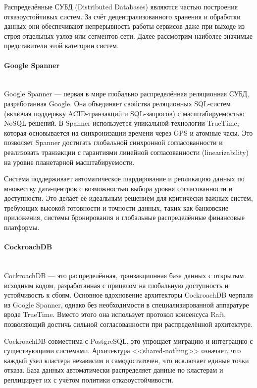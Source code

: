 Распределённые СУБД (Distributed Databases) являются частью построения отказоустойчивых систем. За счёт децентрализованного хранения и обработки данных они обеспечивают непрерывность работы сервисов даже при выходе из строя отдельных узлов или сегментов сети. Далее рассмотрим наиболее значимые представители этой категории систем. \autocite{OszuValduriez}

\paragraph{Google Spanner} ~\\

Google Spanner — первая в мире глобально распределённая реляционная СУБД, разработанная Google. Она объединяет свойства реляционных SQL-систем (включая поддержку ACID-транзакций и SQL-запросов) с масштабируемостью NoSQL-решений. В Spanner используется уникальной технологии TrueTime, которая основывается на синхронизации времени через GPS и атомные часы. Это позволяет Spanner достигать глобальной синхронной согласованности и реализовать транзакции с гарантиями линейной согласованности (linearizability) на уровне планетарной масштабируемости. \autocite{Kleppmann}

Система поддерживает автоматическое шардирование и репликацию данных по множеству дата-центров с возможностью выбора уровня согласованности и доступности. Это делает её идеальным решением для критически важных систем, требующих высокой готовности и точности данных, таких как банковские приложения, системы бронирования и глобальные распределённые финансовые платформы.

\paragraph{CockroachDB} ~\\

CockroachDB — это распределённая, транзакционная база данных с открытым исходным кодом, разработанная с прицелом на глобальную доступность и устойчивость к сбоям. Основное вдохновение архитекторы CockroachDB черпали из Google Spanner, однако без необходимости в специализированной аппаратуре вроде TrueTime. Вместо этого она использует протокол консенсуса Raft, позволяющий достичь сильной согласованности при распределённой архитектуре. \autocite{Kleppmann}

CockroachDB совместима с PostgreSQL, это упрощает миграцию и интеграцию с существующими системами. Архитектура <<shared-nothing>> означает, что каждый узел кластера независим и самодостаточен, что исключает единые точки отказа. База данных автоматически распределяет данные по кластерам и реплицирует их с учётом политики отказоустойчивости.

